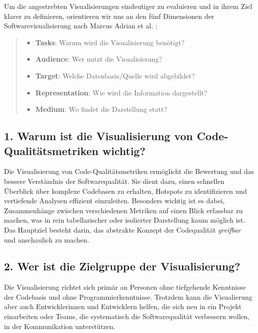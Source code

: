 Um die angestrebten Visualisierungen eindeutiger zu evaluieren und in ihrem Ziel klarer zu definieren, orientieren wir uns an den fünf Dimensionen der Softwarevisualisierung nach Marcus Adrian et al. \cite[2]{3dsoftwareMarcus}:
\begin{quote}
    \begin{itemize}
        \item \textbf{Tasks}: Warum wird die Visualisierung benötigt?
        \item \textbf{Audience}: Wer nutzt die Visualisierung?
        \item \textbf{Target}: Welche Datenbasis/Quelle wird abgebildet?
        \item \textbf{Representation}: Wie wird die Information dargestellt?
        \item \textbf{Medium}: Wo findet die Darstellung statt?
    \end{itemize}
\end{quote}

\subsection*{1. Warum ist die Visualisierung von Code-Qualitätsmetriken wichtig?}
Die Visualisierung von Code-Qualitätsmetriken ermöglicht die Bewertung und das bessere Verständnis der Softwarequalität. Sie dient dazu, einen schnellen Überblick über komplexe Codebasen zu erhalten, Hotspots zu identifizieren und vertiefende Analysen effizient einzuleiten. Besonders wichtig ist es dabei, Zusammenhänge zwischen verschiedenen Metriken auf einen Blick erfassbar zu machen, was in rein tabellarischer oder isolierter Darstellung kaum möglich ist. Das Hauptziel besteht darin, das abstrakte Konzept der Codequalität \textit{greifbar} und anschaulich zu machen.

\subsection*{2. Wer ist die Zielgruppe der Visualisierung?}
Die Visualisierung richtet sich primär an Personen ohne tiefgehende Kenntnisse der Codebasis und ohne Programmierkenntnisse. Trotzdem kann die Visualierung aber auch Entwicklerinnen und Entwicklern helfen, die sich neu in ein Projekt einarbeiten oder Teams, die systematisch die Softwarequalität verbessern wollen, in der Kommunikation unterstützen.

